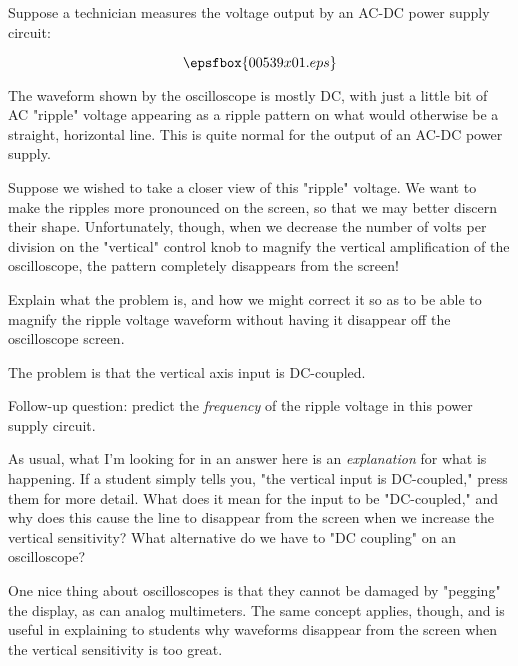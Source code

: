 

Suppose a technician measures the voltage output by an AC-DC power supply circuit:

$$\epsfbox{00539x01.eps}$$

The waveform shown by the oscilloscope is mostly DC, with just a little bit of AC "ripple" voltage appearing as a ripple pattern on what would otherwise be a straight, horizontal line.  This is quite normal for the output of an AC-DC power supply. 

Suppose we wished to take a closer view of this "ripple" voltage.  We want to make the ripples more pronounced on the screen, so that we may better discern their shape.  Unfortunately, though, when we decrease the number of volts per division on the "vertical" control knob to magnify the vertical amplification of the oscilloscope, the pattern completely disappears from the screen!

Explain what the problem is, and how we might correct it so as to be able to magnify the ripple voltage waveform without having it disappear off the oscilloscope screen.







The problem is that the vertical axis input is DC-coupled.

\vskip 10pt

Follow-up question: predict the {\it frequency} of the ripple voltage in this power supply circuit.







As usual, what I'm looking for in an answer here is an {\it explanation} for what is happening.  If a student simply tells you, "the vertical input is DC-coupled," press them for more detail.  What does it mean for the input to be "DC-coupled," and why does this cause the line to disappear from the screen when we increase the vertical sensitivity?  What alternative do we have to "DC coupling" on an oscilloscope?

One nice thing about oscilloscopes is that they cannot be damaged by "pegging" the display, as can analog multimeters.  The same concept applies, though, and is useful in explaining to students why waveforms disappear from the screen when the vertical sensitivity is too great.




